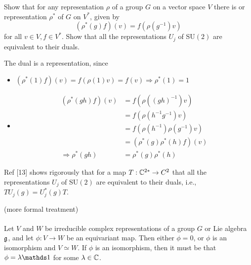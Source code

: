 \documentclass[10pt]{article}
\begin{document}
\begin{example}
	Show that for any representation $\rho$ of a group $G$ on a vector space $V$ there is  or  representation $\rho^*$ of $G$ on $V^*$, given by
	$$
	(\rho^*(g)f)(v)=f(\rho(g^{-1})v)
	$$
	for all $v \in V, f \in V^*$. Show that all the representations $U_j$ of SU$(2)$ are equivalent to their duals.
\end{example}
\sol The dual is a representation, since
\begin{itemize}
	\item $(\rho^*(1)f)(v) = f(\rho(1)v) = f(v) \Rightarrow \rho^*(1) = 1$
	\item $$\begin{aligned}
		(\rho^*(gh)f)(v) &= f(\rho((gh)^{-1})v)\\
		&= f(\rho(h^{-1}g^{-1})v)\\
		&= f(\rho(h^{-1})\rho(g^{-1})v)\\
		&= (\rho^*(g)\rho^*(h)f)(v)\\
		\Rightarrow \rho^*(gh) &= \rho^*(g)\rho^*(h)
	\end{aligned}$$
\end{itemize}
Ref [13] shows rigorously that for a map $T:\mathbb{C}^{2*} \to C^2$ that all the representations $U_j$ of SU$(2)$ are equivalent to their duals, i.e., $TU_j(g) = U_j^*(g)T$.


\begin{definition}
	 (more formal treatment)\\\\
	Let $V$ and $W$ be irreducible complex representations of a group $G$ or Lie algebra $\mathfrak{g}$, and let $\phi:V\to W$ be an equivariant map. Then either $\phi = 0$, or $\phi$ is an isomorphism and $V \simeq W$. If $\phi$ is an isomorphism, then it must be that $\phi = \lambda\id$ for some $\lambda \in \mathbb{C}$.
\end{definition}
\end{document}
